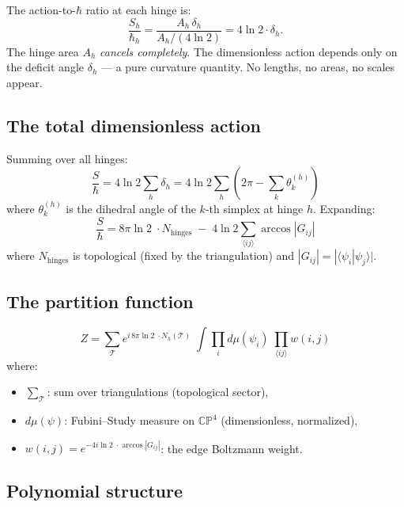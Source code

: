 \documentclass[12pt]{article}
\theoremstyle{remark}
\theoremstyle{definition}
\begin{document}
The action-to-$\hbar$ ratio at each hinge is:
\begin{equation}
\frac{S_h}{\hbar_h} = \frac{A_h\,\delta_h}{A_h/(4\ln 2)} = 4\ln 2 \cdot \delta_h.
\end{equation}
The hinge area $A_h$ \emph{cancels completely}. The dimensionless action depends only on the deficit angle $\delta_h$ --- a pure curvature quantity. No lengths, no areas, no scales appear.

\subsection{The total dimensionless action}

Summing over all hinges:
\begin{equation}
\frac{S}{\hbar} = 4\ln 2\sum_h \delta_h = 4\ln 2\sum_h \left(2\pi - \sum_{k} \theta_k^{(h)}\right)
\end{equation}
where $\theta_k^{(h)}$ is the dihedral angle of the $k$-th simplex at hinge $h$. Expanding:
\begin{equation}
\boxed{\frac{S}{\hbar} = 8\pi\ln 2\;\cdot N_\text{hinges} \;-\; 4\ln 2\!\!\sum_{\langle ij\rangle}\!\! \arccos|G_{ij}|}
\end{equation}
where $N_\text{hinges}$ is topological (fixed by the triangulation) and $|G_{ij}| = |\langle\psi_i|\psi_j\rangle|$.

\subsection{The partition function}

\begin{equation}
\boxed{Z = \sum_{\mathcal{T}} e^{i\,8\pi\ln 2\;\cdot N_h(\mathcal{T})}\;\int\!\prod_i d\mu(\psi_i)\;\prod_{\langle ij\rangle} w(i,j)}
\end{equation}
where:
\begin{itemize}
\item $\sum_\mathcal{T}$: sum over triangulations (topological sector),
\item $d\mu(\psi)$: Fubini--Study measure on $\mathbb{CP}^4$ (dimensionless, normalized),
\item $w(i,j) = e^{-4i\ln 2\;\cdot\arccos|G_{ij}|}$: the edge Boltzmann weight.
\end{itemize}

\subsection{Polynomial structure}
\end{document}
